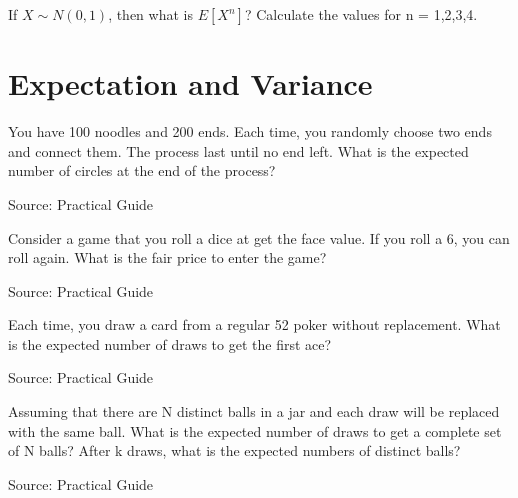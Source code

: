 \begin{exe}
If $X \sim N(0,1)$, then what is $E[X^n]$? Calculate the values for n = 1,2,3,4.
\end{exe}
\begin{teacher}
\begin{sol}
\end{sol}
\end{teacher}

\section{Expectation and Variance}
\begin{exe}
You have 100 noodles and 200 ends. Each time, you randomly choose two ends and connect them. The process last until no end left. What is the expected number of circles at the end of the process?
\end{exe}
Source: Practical Guide
\begin{teacher}
\begin{sol}
\end{sol}
\end{teacher}

\begin{exe}
Consider a game that you roll a dice at get the face value. If you roll a 6, you can roll again. What is the fair price to enter the game?
\end{exe}
Source: Practical Guide
\begin{teacher}
\begin{sol}
\end{sol}
\end{teacher}

\begin{exe}
Each time, you draw a card from a regular 52 poker without replacement. What is the expected number of draws to get the first ace?
\end{exe}
Source: Practical Guide
\begin{teacher}
\begin{sol}
\end{sol}
\end{teacher}

\begin{exe}
Assuming that there are N distinct balls in a jar and each draw will be replaced with the same ball. What is the expected number of draws to get a complete set of N balls? After k draws, what is the expected numbers of distinct balls?

\end{exe}
Source: Practical Guide
\begin{teacher}
\begin{sol}
\end{sol}
\end{teacher}

